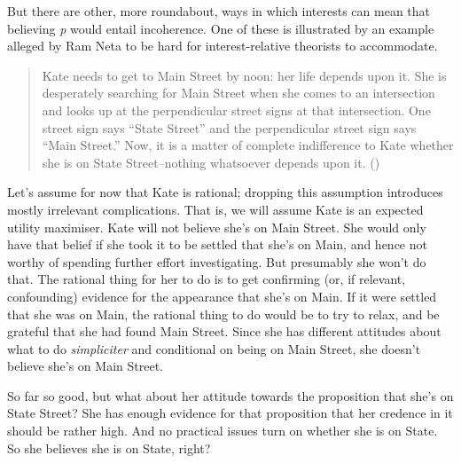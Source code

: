 \documentclass[
  10pt,
  letterpaper,
  DIV=11,
  numbers=noendperiod,
  twoside]{scrartcl}
\begin{document}
But there are other, more roundabout, ways in which interests can mean
that believing \emph{p} would entail incoherence. One of these is
illustrated by an example alleged by Ram Neta to be hard for
interest-relative theorists to accommodate.

\begin{quote}
Kate needs to get to Main Street by noon: her life depends upon it. She
is desperately searching for Main Street when she comes to an
intersection and looks up at the perpendicular street signs at that
intersection. One street sign says ``State Street'' and the
perpendicular street sign says ``Main Street.'' Now, it is a matter of
complete indifference to Kate whether she is on State Street--nothing
whatsoever depends upon it. ()
\end{quote}

Let's assume for now that Kate is rational; dropping this assumption
introduces mostly irrelevant complications. That is, we will assume Kate
is an expected utility maximiser. Kate will not believe she's on Main
Street. She would only have that belief if she took it to be settled
that she's on Main, and hence not worthy of spending further effort
investigating. But presumably she won't do that. The rational thing for
her to do is to get confirming (or, if relevant, confounding) evidence
for the appearance that she's on Main. If it were settled that she was
on Main, the rational thing to do would be to try to relax, and be
grateful that she had found Main Street. Since she has different
attitudes about what to do \emph{simpliciter} and conditional on being
on Main Street, she doesn't believe she's on Main Street.

So far so good, but what about her attitude towards the proposition that
she's on State Street? She has enough evidence for that proposition that
her credence in it should be rather high. And no practical issues turn
on whether she is on State. So she believes she is on State, right?
\end{document}

